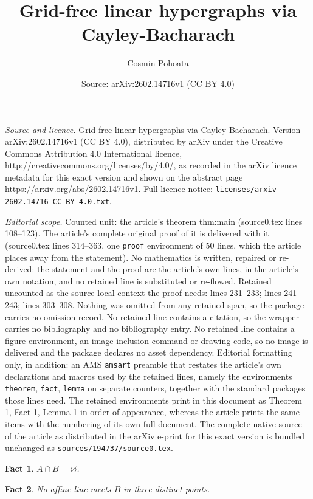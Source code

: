 \documentclass[10pt,a4paper]{amsart}
\title{Grid-free linear hypergraphs via Cayley-Bacharach}
\author{Cosmin Pohoata}
\date{Source: arXiv:2602.14716v1 (CC BY 4.0)}
\newtheorem{fact}{Fact}
\begin{document}
\maketitle

\noindent\emph{Source and licence.} Grid-free linear hypergraphs via Cayley-Bacharach. Version arXiv:2602.14716v1 (CC BY 4.0), distributed by arXiv under the Creative Commons Attribution 4.0 International licence, http://creativecommons.org/licenses/by/4.0/, as recorded in the arXiv licence metadata for this exact version and shown on the abstract page https://arxiv.org/abs/2602.14716v1. Full licence notice: \texttt{licenses/arxiv-2602.14716-CC-BY-4.0.txt}.\par\smallskip

\noindent\textit{Editorial scope.} Counted unit: the article's theorem thm:main (source0.tex lines 108--123). The article's complete original proof of it is delivered with it (source0.tex lines 314--363, one \texttt{proof} environment of 50 lines, which the article places away from the statement). No mathematics is written, repaired or re-derived: the statement and the proof are the article's own lines, in the article's own notation, and no retained line is substituted or re-flowed.  Retained uncounted as the source-local context the proof needs: lines 231--233; lines 241--243; lines 303--308.  Nothing was omitted from any retained span, so the package carries no omission record.  No retained line contains a citation, so the wrapper carries no bibliography and no bibliography entry.  No retained line contains a figure environment, an image-inclusion command or drawing code, so no image is delivered and the package declares no asset dependency.  Editorial formatting only, in addition: an AMS \texttt{amsart} preamble that restates the article's own declarations and macros used by the retained lines, namely the environments \texttt{theorem}, \texttt{fact}, \texttt{lemma} on separate counters, together with the standard packages those lines need.  The retained environments print in this document as Theorem 1, Fact 1, Lemma 1 in order of appearance, whereas the article prints the same items with the numbering of its own full document.  The complete native source of the article as distributed in the arXiv e-print for this exact version is bundled unchanged as \texttt{sources/194737/source0.tex}.
\begin{fact}\label{lem:disjoint}
$A\cap B=\varnothing$.
\end{fact}

\begin{fact}\label{lem:nothree}
No affine line meets $B$ in three distinct points.
\end{fact}
\end{document}
